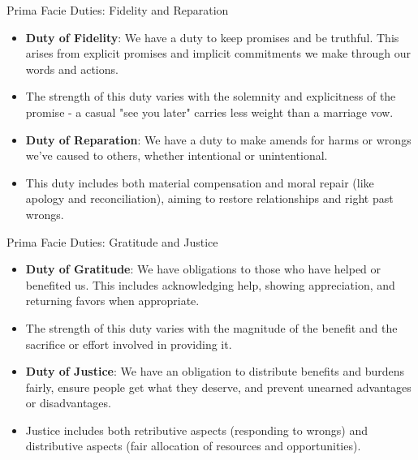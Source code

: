 \documentclass{beamer}
\begin{document}
\begin{frame}{Prima Facie Duties: Fidelity and Reparation}
\begin{itemize}
    \item \textbf{Duty of Fidelity}: We have a duty to keep promises and be truthful. This arises from explicit promises and implicit commitments we make through our words and actions.
    
    \item The strength of this duty varies with the solemnity and explicitness of the promise - a casual "see you later" carries less weight than a marriage vow.
    
    \item \textbf{Duty of Reparation}: We have a duty to make amends for harms or wrongs we've caused to others, whether intentional or unintentional.
    
    \item This duty includes both material compensation and moral repair (like apology and reconciliation), aiming to restore relationships and right past wrongs.
\end{itemize}
\end{frame}

\begin{frame}{Prima Facie Duties: Gratitude and Justice}
\begin{itemize}
    \item \textbf{Duty of Gratitude}: We have obligations to those who have helped or benefited us. This includes acknowledging help, showing appreciation, and returning favors when appropriate.
    
    \item The strength of this duty varies with the magnitude of the benefit and the sacrifice or effort involved in providing it.
    
    \item \textbf{Duty of Justice}: We have an obligation to distribute benefits and burdens fairly, ensure people get what they deserve, and prevent unearned advantages or disadvantages.
    
    \item Justice includes both retributive aspects (responding to wrongs) and distributive aspects (fair allocation of resources and opportunities).
\end{itemize}
\end{frame}
\end{document}
